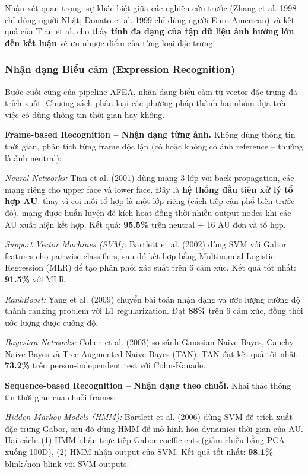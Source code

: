 \documentclass[12pt,a4paper]{article}
\let\oldtextbf\textbf
\renewcommand{\textbf}[1]{\oldtextbf{\textcolor{hcmublue}{#1}}}
\begin{document}
Nhận xét quan trọng: sự khác biệt giữa các nghiên cứu trước (Zhang et al. 1998 chỉ dùng người Nhật; Donato et al. 1999 chỉ dùng người Euro-American) và kết quả của Tian et al. cho thấy \textbf{tính đa dạng của tập dữ liệu ảnh hưởng lớn đến kết luận} về ưu nhược điểm của từng loại đặc trưng.

\subsubsection{Nhận dạng Biểu cảm (Expression Recognition)}

Bước cuối cùng của pipeline AFEA, nhận dạng biểu cảm từ vector đặc trưng đã trích xuất. Chương sách phân loại các phương pháp thành hai nhóm dựa trên việc có dùng thông tin thời gian hay không.

\textbf{Frame-based Recognition -- Nhận dạng từng ảnh.}
Không dùng thông tin thời gian, phân tích từng frame độc lập (có hoặc không có ảnh reference -- thường là ảnh neutral):

\textit{Neural Networks:} Tian et al. (2001) dùng mạng 3 lớp với back-propagation, các mạng riêng cho upper face và lower face. Đây là \textbf{hệ thống đầu tiên xử lý tổ hợp AU}: thay vì coi mỗi tổ hợp là một lớp riêng (cách tiếp cận phổ biến trước đó), mạng được huấn luyện để kích hoạt đồng thời nhiều output nodes khi các AU xuất hiện kết hợp. Kết quả: \textbf{95.5\%} trên neutral + 16 AU đơn và tổ hợp.

\textit{Support Vector Machines (SVM):} Bartlett et al. (2002) dùng SVM với Gabor features cho pairwise classifiers, sau đó kết hợp bằng Multinomial Logistic Regression (MLR) để tạo phân phối xác suất trên 6 cảm xúc. Kết quả tốt nhất: \textbf{91.5\%} với MLR.

\textit{RankBoost:} Yang et al. (2009) chuyển bài toán nhận dạng và ước lượng cường độ thành ranking problem với L1 regularization. Đạt \textbf{88\%} trên 6 cảm xúc, đồng thời ước lượng được cường độ.

\textit{Bayesian Networks:} Cohen et al. (2003) so sánh Gaussian Naive Bayes, Cauchy Naive Bayes và Tree Augmented Naive Bayes (TAN). TAN đạt kết quả tốt nhất \textbf{73.2\%} trên person-independent test với Cohn-Kanade.

\textbf{Sequence-based Recognition -- Nhận dạng theo chuỗi.}
Khai thác thông tin thời gian của chuỗi frames:

\textit{Hidden Markov Models (HMM):} Bartlett et al. (2006) dùng SVM để trích xuất đặc trưng Gabor, sau đó dùng HMM để mô hình hóa dynamics thời gian của AU. Hai cách: (1) HMM nhận trực tiếp Gabor coefficients (giảm chiều bằng PCA xuống 100D), (2) HMM nhận output của SVM. Kết quả tốt nhất: \textbf{98.1\%} blink/non-blink với SVM outputs.
\end{document}
